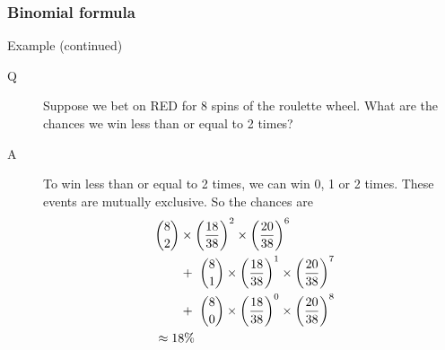 \documentclass[handout]{beamer}
\begin{document}

   \begin{frame} \frametitle{Binomial formula}

   \begin{block}
   {Example (continued)}
   \begin{description}

   \item[Q] Suppose we bet on {\color{red} RED} for 8 spins of the roulette wheel.
   What are the chances we win less than or equal to 2 times?

   \item[A] To win less than or equal to 2 times, we can win 0, 1 or 2 times.
   These events are mutually exclusive. So the chances are
   $$
   \begin{aligned}
   \lefteqn{\binom{8}{2} \times \left(\frac{18}{38}\right)^2 \times \left( \frac{20}{38} \right)^6} \\
   & \qquad + \ \binom{8}{1} \times \left(\frac{18}{38}\right)^1 \times \left( \frac{20}{38} \right)^7 \\
   & \qquad + \ \binom{8}{0} \times \left(\frac{18}{38}\right)^0 \times \left( \frac{20}{38} \right)^8 \\
   & \approx 18 \%
   \end{aligned}
   $$
   \end{description}
   \end{block}
   \end{frame}

\end{document}
